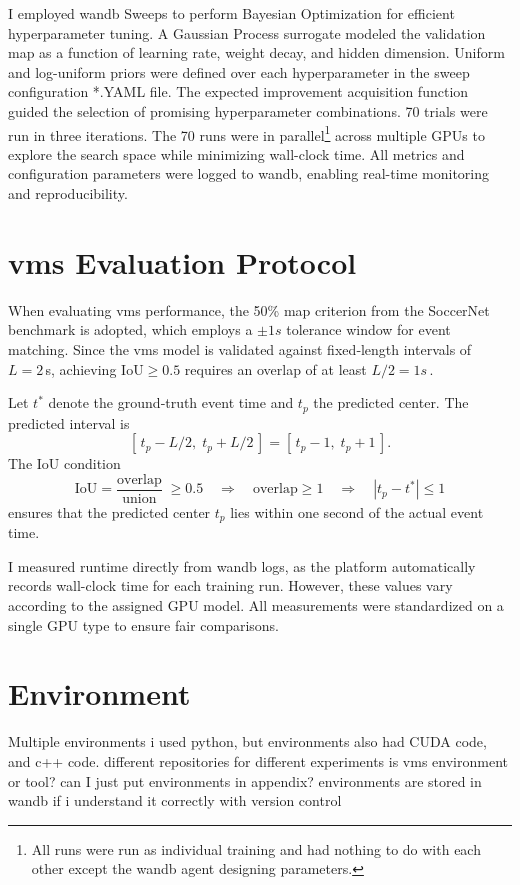 I employed \acrshort{wandb} Sweeps to perform Bayesian Optimization for efficient hyperparameter tuning. A Gaussian Process surrogate modeled the validation \acrshort{map} as a function of learning rate, weight decay, and hidden dimension. Uniform and log-uniform priors were defined over each hyperparameter in the sweep configuration *.YAML file. The expected improvement acquisition function guided the selection of promising hyperparameter combinations. 70 trials were run in three iterations. The 70 runs were in parallel\footnote{All runs were run as individual training and had nothing to do with each other except the \acrshort{wandb} agent designing parameters. } across multiple GPUs to explore the search space while minimizing wall-clock time. All metrics and configuration parameters were logged to \acrshort{wandb}, enabling real-time monitoring and reproducibility. 





\section{\acrshort{vms} Evaluation Protocol}
When evaluating \acrshort{vms} performance, the 50\% \acrshort{map} criterion from the SoccerNet benchmark is adopted, which employs a $\pm1s$ tolerance window for event matching. Since the \acrshort{vms} model is validated against fixed‐length intervals of $L = 2\,$s, achieving $\mathrm{IoU}\ge0.5$ requires an overlap of at least $L/2 = 1s\,$.

Let $t^*$ denote the ground‐truth event time and $t_p$ the predicted center. The predicted interval is
\[
    [\,t_p - L/2,\;t_p + L/2\,]
    = [\,t_p - 1,\;t_p + 1\,].
\] 
The IoU condition
\[
    \mathrm{IoU}
    = \frac{\text{overlap}}{\text{union}}
    \;\ge0.5
    \quad\Longrightarrow\quad
    \text{overlap}\ge1
    \quad\Longrightarrow\quad
    |t_p - t^*|\le1
\]
ensures that the predicted center $t_p$ lies within one second of the actual event time.

I measured runtime directly from \acrshort{wandb} logs, as the platform automatically records wall-clock time for each training run. However, these values vary according to the assigned GPU model. All measurements were standardized on a single GPU type to ensure fair comparisons. 

\section{Environment} 

Multiple environments
i used python, but environments also had CUDA code, and c++ code. 
different repositories for different experiments
is vms environment or tool?
can I just put environments in appendix? environments are stored in wandb if i understand it correctly with version control